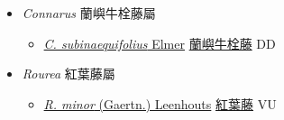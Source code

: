 
  \begin{itemize}
 \item[] \textit{Connarus} 蘭嶼牛栓藤屬
                    
  \begin{itemize}
        \item[] \href{http://www.theplantlist.org/tpl1.1/search?q=Connarus+subinaequifolius}{\textit{C. subinaequifolius} Elmer}   \href{\detokenize{http://taibnet.sinica.edu.tw/chi/taibnet_species_list.php?T2=蘭嶼牛栓藤&T2_new_value=true&fr=y}}{蘭嶼牛栓藤} DD
  \end{itemize}
 \item[] \textit{Rourea} 紅葉藤屬
                    
  \begin{itemize}
        \item[] \href{http://www.theplantlist.org/tpl1.1/search?q=Rourea+minor}{\textit{R. minor} (Gaertn.) Leenhouts}   \href{\detokenize{http://taibnet.sinica.edu.tw/chi/taibnet_species_list.php?T2=紅葉藤&T2_new_value=true&fr=y}}{紅葉藤} VU
  \end{itemize}
  \end{itemize}
